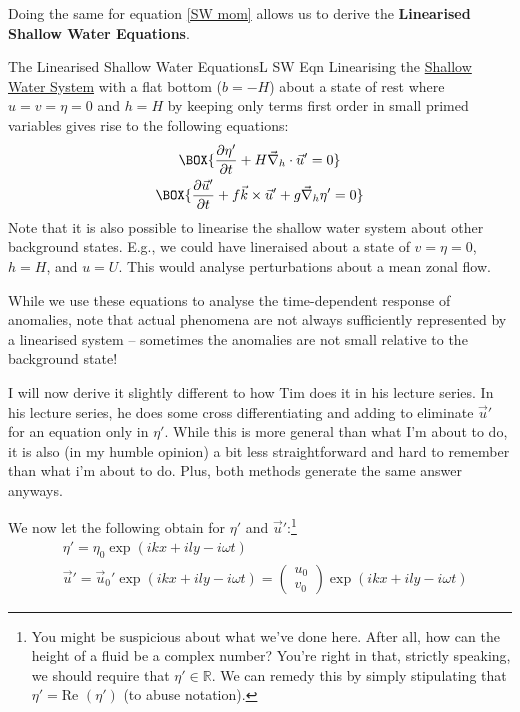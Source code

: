 Doing the same for equation \ref{SW mom} allows us to derive the \textbf{Linearised Shallow Water Equations}.

\begin{fact}{The Linearised Shallow Water Equations}{L SW Eqn}\label{L SW Eqn}
    Linearising the \hyperref[Shallow Water System]{Shallow Water System} with a flat bottom ($b=-H$) about a state of rest where $u=v=\eta=0$ and $h=H$ by keeping only terms first order in small primed variables gives rise to the following equations: 
    \begin{gather}
        \label{SW Lin mass}
        \BOX{\frac{\partial \eta'}{\partial t}+H\vec{\nabla}_h\cdot \vec{u}'=0}\\
        \label{SW Lin mom}
        \BOX{
            \frac{\partial \vec{u}'}{\partial t}+f\vec{k}\times\vec{u}'
            +
            g\vec{\nabla}_h \eta'=0
        }
    \end{gather}
    Note that it is also possible to linearise the shallow water system about other background states. E.g., we could have lineraised about a state of $v=\eta=0$, $h=H$, and $u=U$. This would analyse perturbations about a mean zonal flow.

    While we use these equations to analyse the time-dependent response of anomalies, note that actual phenomena are not always sufficiently represented by a linearised system – sometimes the anomalies are not small relative to the background state!
\end{fact}

I will now derive it slightly different to how Tim does it in his lecture series. In his lecture series, he does some cross differentiating and adding to eliminate $\vec{u}'$ for an equation only in $\eta'$. While this is more general than what I'm about to do, it is also (in my humble opinion) a bit less straightforward and hard to remember than what i'm about to do. Plus, both methods generate the same answer anyways.

We now let the following obtain for $\eta'$ and $\vec{u}'$:\footnote{
    You might be suspicious about what we've done here. After all, how can the height of a fluid be a complex number? You're right in that, strictly speaking, we should require that $\eta'\in\mathbb{R}$. We can remedy this by simply stipulating that $\eta'=\text{Re }\left( \eta' \right)$ (to abuse notation).
}
\begin{align*}
    &\eta' = \eta_0 \exp\left( ikx+ily-i\omega t \right)\\
    &\vec{u}' = \vec{u}_0' \exp\left( ikx+ily-i\omega t \right)=\left( \begin{array}{c}
        u_0\\v_0
    \end{array} \right)\exp\left( ikx+ily-i\omega t \right)
\end{align*}

